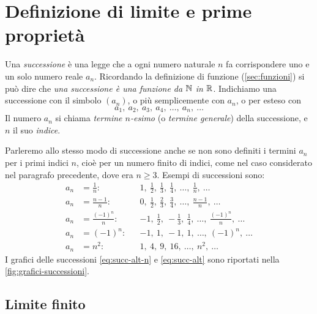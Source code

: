 \section{Definizione di limite e prime proprietà}
\label{sec:def-limite}

\begin{definizione}[Successione]
Una \emph{successione} è una legge che a ogni numero naturale $n$ fa corrispondere uno e
un solo numero reale $a_{n}$. Ricordando la definizione di funzione (\cref{sec:funzioni})
si può dire che \emph{una successione è una funzione da $\mathbb{N}$ in $\mathbb{R}$}. Indichiamo una
successione con il simbolo $(a_{n})$, o più semplicemente con $a_{n}$, o per esteso con
\begin{equation}\label{eq:succ-esteso}
  a_{1},\ a_{2},\ a_{3},\ a_{4},\ \dots,\ a_{n},\ \dots
\end{equation}
Il numero $a_{n}$ si chiama \emph{termine $n$-esimo} (o \emph{termine generale}) della
successione, e $n$ il suo \emph{indice}.
\end{definizione}

Parleremo allo stesso modo di successione anche se non sono definiti i termini $a_{n}$
per i primi indici $n$, cioè per un numero finito di indici, come nel caso considerato
nel paragrafo precedente, dove era $n\ge3$. Esempi di successioni sono:
\begin{align}
  a_{n}&=\frac1n: & &1,\ \tfrac12,\ \tfrac13,\ \tfrac14,\ \dots,\ \tfrac1n,\ \dots \label{eq:succ-1n}\\
  a_{n}&=\frac{n-1}{n}: & &0,\ \tfrac12,\ \tfrac23,\ \tfrac34,\ \dots,\ \tfrac{n-1}{n},\ \dots \label{eq:succ-n1n}\\
  a_{n}&=\frac{(-1)^{n}}{n}: & &-1,\ \tfrac12,\ -\tfrac13,\ \tfrac14,\ \dots,\ \tfrac{(-1)^{n}}{n},\ \dots \label{eq:succ-alt-n}\\
  a_{n}&=(-1)^{n}: & &-1,\ 1,\ -1,\ 1,\ \dots,\ (-1)^{n},\ \dots \label{eq:succ-alt}\\
  a_{n}&=n^{2}: & &1,\ 4,\ 9,\ 16,\ \dots,\ n^{2},\ \dots \label{eq:succ-n2}
\end{align}
I grafici delle successioni \eqref{eq:succ-alt-n} e \eqref{eq:succ-alt} sono riportati
nella \cref{fig:grafici-successioni}.

\subsection{Limite finito}

